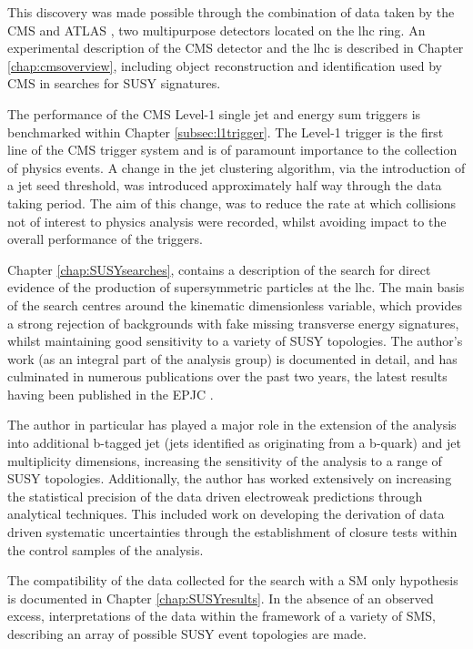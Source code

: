 This discovery was made possible through the combination of data taken by the \acf{CMS} \cite{cmstdr} and \ac{ATLAS} \cite{atlastdr}, two multipurpose detectors located on the \ac{lhc} ring. An experimental description of the \ac{CMS} detector and the \ac{lhc} is described in Chapter \ref{chap:cmsoverview}, including object reconstruction and identification used by \ac{CMS} in searches for \ac{SUSY} signatures. 

The performance of the \ac{CMS} Level-1 single jet and energy sum triggers is benchmarked within Chapter \ref{subsec:l1trigger}. The Level-1 trigger is the first line of the \ac{CMS} trigger system and is of paramount importance to the collection of physics events. A change in the jet clustering algorithm, via the introduction of a jet seed threshold, was introduced approximately half way through the data taking period. The aim of this change, was to reduce the rate at which collisions not of interest to physics analysis were recorded, whilst avoiding impact to the overall performance of the triggers.

Chapter \ref{chap:SUSYsearches}, contains a description of the search for direct evidence of the production of supersymmetric particles at the \ac{lhc}. The main basis of the search centres around the kinematic dimensionless \alphat variable, which provides a strong rejection of backgrounds with fake missing transverse energy signatures, whilst maintaining good sensitivity to a variety of \ac{SUSY} topologies. The author's work (as an integral part of the analysis group) is documented in detail, and has culminated in numerous publications over the past two years, the latest results having been published in the \acf{EPJC} \cite{ra1_epjc}. 

The author in particular has played a major role in the extension of the \alphat analysis into additional b-tagged jet (jets identified as originating from a b-quark) and jet multiplicity dimensions, increasing the sensitivity of the analysis to a range of \ac{SUSY} topologies. Additionally, the author has worked extensively on increasing the statistical precision of the data driven electroweak predictions through analytical techniques. This included work on developing the derivation of data driven systematic uncertainties through the establishment of closure tests within the control samples of the analysis. 

The compatibility of the data collected for the \alphat search with a \ac{SM} only hypothesis is documented in Chapter \ref{chap:SUSYresults}. In the absence of an observed excess, interpretations of the data within the framework of a variety of \acf{SMS}, describing an array of possible \ac{SUSY} event topologies are made.

